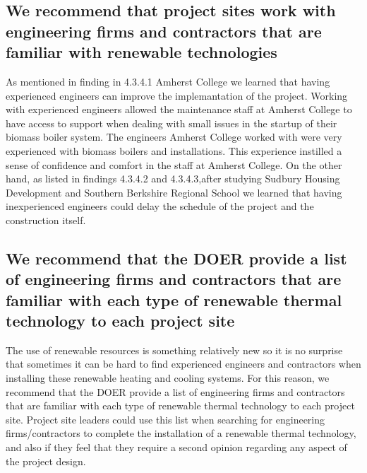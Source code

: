 \subsection{We recommend that project sites work with engineering firms and contractors that are familiar with renewable technologies}
\par As mentioned in finding in 4.3.4.1 Amherst College we learned that having experienced engineers can improve the implemantation of the project. Working with experienced engineers allowed the maintenance staff at Amherst College to have access to support when dealing with small issues in the startup of their biomass boiler system. The engineers Amherst College worked with were very experienced with biomass boilers and installations. This experience instilled a sense of confidence and comfort in the staff at Amherst College. On the other hand, as listed in findings 4.3.4.2 and 4.3.4.3,after studying Sudbury Housing Development and Southern Berkshire Regional School we learned that having inexperienced engineers could delay the schedule of the project and the construction itself. 

\subsection{We recommend that the DOER provide a list of engineering firms and contractors that are familiar with each type of renewable thermal technology to each project site}
\par The use of renewable resources is something relatively new so it is no surprise that sometimes it can be hard to find experienced engineers and contractors when installing these renewable heating and cooling systems. For this reason, we recommend that the DOER provide a list of engineering firms and contractors that are familiar with each type of renewable thermal technology to each project site. Project site leaders could use this list when searching for engineering firms/contractors to complete the installation of a renewable thermal technology, and also if they feel that they require a second opinion regarding any aspect of the project design.

